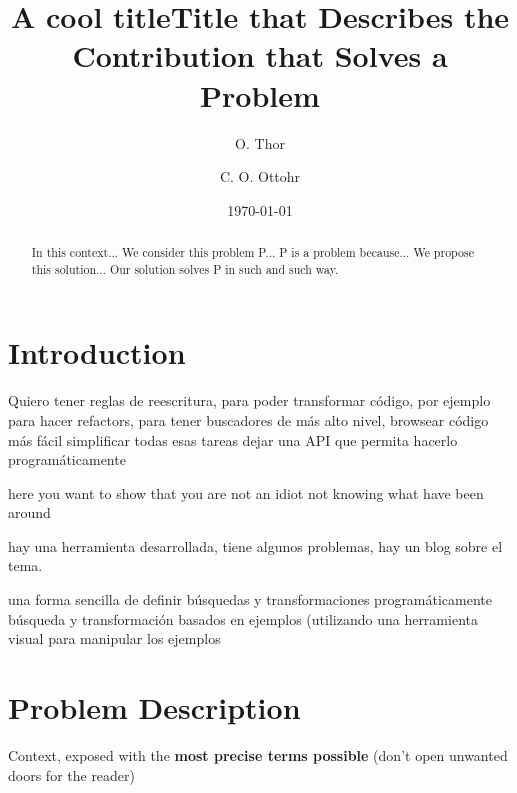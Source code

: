\documentclass{article}
\begin{document}
\title{A cool title}
\maketitle


\title{Title that Describes the Contribution that Solves a Problem}
\author{O. Thor \and C. O. Ottohr}
\date{\today}
\maketitle

\begin{abstract}
In this context...
We consider this problem P...
P is a problem because...
We propose this solution...
Our solution solves P in such and such way.
\end{abstract}


\section{Introduction}
\label{sec:intro}


Quiero tener reglas de reescritura, para poder transformar código, 
por ejemplo para hacer refactors, para tener buscadores de más alto nivel, browsear código más fácil
simplificar todas esas tareas
dejar una API que permita hacerlo programáticamente

	here you want to show that you are not an idiot not knowing what have been around

hay una herramienta desarrollada, tiene algunos problemas, hay un blog sobre el tema.

una forma sencilla de definir búsquedas y transformaciones programáticamente
búsqueda y transformación basados en ejemplos (utilizando una herramienta visual para manipular los ejemplos





\section{Problem Description}
\label{sec:problem}

Context, exposed with the \textbf{most precise terms possible} (don't open
unwanted doors for the reader)
\end{document}
